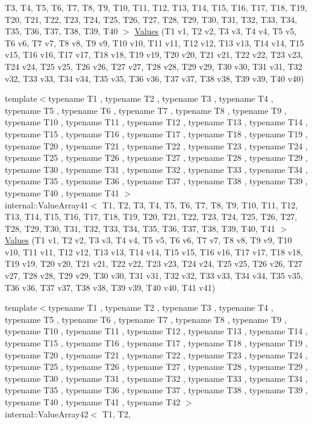 \begin{DoxyCompactItemize}
\-T3, \-T4, \-T5, \-T6, \-T7, \-T8, \-T9, \*
\-T10, \-T11, \-T12, \-T13, \-T14, \-T15, \*
\-T16, \-T17, \-T18, \-T19, \-T20, \-T21, \*
\-T22, \-T23, \-T24, \-T25, \-T26, \-T27, \*
\-T28, \-T29, \-T30, \-T31, \-T32, \-T33, \*
\-T34, \-T35, \-T36, \-T37, \-T38, \-T39, \*
\-T40 $>$ \hyperlink{namespacetesting_adaa8b96d44c103a70e5c4a4b3430ef4d}{\-Values} (\-T1 v1, \-T2 v2, \-T3 v3, \-T4 v4, \-T5 v5, \-T6 v6, \-T7 v7, \-T8 v8, \-T9 v9, \-T10 v10, \-T11 v11, \-T12 v12, \-T13 v13, \-T14 v14, \-T15 v15, \-T16 v16, \-T17 v17, \-T18 v18, \-T19 v19, \-T20 v20, \-T21 v21, \-T22 v22, \-T23 v23, \-T24 v24, \-T25 v25, \-T26 v26, \-T27 v27, \-T28 v28, \-T29 v29, \-T30 v30, \-T31 v31, \-T32 v32, \-T33 v33, \-T34 v34, \-T35 v35, \-T36 v36, \-T37 v37, \-T38 v38, \-T39 v39, \-T40 v40)
\item 
{\footnotesize template$<$typename T1 , typename T2 , typename T3 , typename T4 , typename T5 , typename T6 , typename T7 , typename T8 , typename T9 , typename T10 , typename T11 , typename T12 , typename T13 , typename T14 , typename T15 , typename T16 , typename T17 , typename T18 , typename T19 , typename T20 , typename T21 , typename T22 , typename T23 , typename T24 , typename T25 , typename T26 , typename T27 , typename T28 , typename T29 , typename T30 , typename T31 , typename T32 , typename T33 , typename T34 , typename T35 , typename T36 , typename T37 , typename T38 , typename T39 , typename T40 , typename T41 $>$ }\\internal\-::\-Value\-Array41$<$ \-T1, \-T2, \*
\-T3, \-T4, \-T5, \-T6, \-T7, \-T8, \-T9, \*
\-T10, \-T11, \-T12, \-T13, \-T14, \-T15, \*
\-T16, \-T17, \-T18, \-T19, \-T20, \-T21, \*
\-T22, \-T23, \-T24, \-T25, \-T26, \-T27, \*
\-T28, \-T29, \-T30, \-T31, \-T32, \-T33, \*
\-T34, \-T35, \-T36, \-T37, \-T38, \-T39, \*
\-T40, \-T41 $>$ \hyperlink{namespacetesting_a51df725741cfcc9539c48885fc2728b0}{\-Values} (\-T1 v1, \-T2 v2, \-T3 v3, \-T4 v4, \-T5 v5, \-T6 v6, \-T7 v7, \-T8 v8, \-T9 v9, \-T10 v10, \-T11 v11, \-T12 v12, \-T13 v13, \-T14 v14, \-T15 v15, \-T16 v16, \-T17 v17, \-T18 v18, \-T19 v19, \-T20 v20, \-T21 v21, \-T22 v22, \-T23 v23, \-T24 v24, \-T25 v25, \-T26 v26, \-T27 v27, \-T28 v28, \-T29 v29, \-T30 v30, \-T31 v31, \-T32 v32, \-T33 v33, \-T34 v34, \-T35 v35, \-T36 v36, \-T37 v37, \-T38 v38, \-T39 v39, \-T40 v40, \-T41 v41)
\item 
{\footnotesize template$<$typename T1 , typename T2 , typename T3 , typename T4 , typename T5 , typename T6 , typename T7 , typename T8 , typename T9 , typename T10 , typename T11 , typename T12 , typename T13 , typename T14 , typename T15 , typename T16 , typename T17 , typename T18 , typename T19 , typename T20 , typename T21 , typename T22 , typename T23 , typename T24 , typename T25 , typename T26 , typename T27 , typename T28 , typename T29 , typename T30 , typename T31 , typename T32 , typename T33 , typename T34 , typename T35 , typename T36 , typename T37 , typename T38 , typename T39 , typename T40 , typename T41 , typename T42 $>$ }\\internal\-::\-Value\-Array42$<$ \-T1, \-T2, \*

\end{DoxyCompactItemize}
